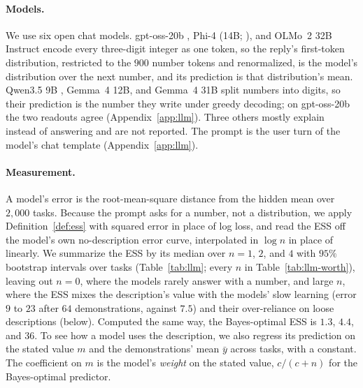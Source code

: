 \documentclass{article}
\begin{document}
\paragraph{Models.} We use six open chat models. gpt-oss-20b \citep{openai2025}, Phi-4 (14B; \citealp{abdin2024}), and OLMo~2 32B Instruct \citep{walsh2025} encode every three-digit integer as one token, so the reply's first-token distribution, restricted to the $900$ number tokens and renormalized, is the model's distribution over the next number, and its prediction is that distribution's mean. Qwen3.5 9B \citep{qwen35}, Gemma~4 12B, and Gemma~4 31B \citep{gemma4} split numbers into digits, so their prediction is the number they write under greedy decoding; on gpt-oss-20b the two readouts agree (Appendix~\ref{app:llm}). Three others mostly explain instead of answering and are not reported. The prompt is the user turn of the model's chat template (Appendix~\ref{app:llm}).


\paragraph{Measurement.} A model's error is the root-mean-square distance from the hidden mean over $2{,}000$ tasks. Because the prompt asks for a number, not a distribution, we apply Definition~\ref{def:ess} with squared error in place of log loss, and read the ESS off the model's own no-description error curve, interpolated in $\log n$ in place of linearly. We summarize the ESS by its median over $n = 1$, $2$, and $4$ with $95\%$ bootstrap intervals over tasks (Table~\ref{tab:llm}; every $n$ in Table~\ref{tab:llm-worth}), leaving out $n = 0$, where the models rarely answer with a number, and large $n$, where the ESS mixes the description's value with the models' slow learning (error $9$ to $23$ after $64$ demonstrations, against $7.5$) and their over-reliance on loose descriptions (below). Computed the same way, the Bayes-optimal ESS is $1.3$, $4.4$, and $36$. To see how a model uses the description, we also regress its prediction on the stated value $m$ and the demonstrations' mean $\bar y$ across tasks, with a constant. The coefficient on $m$ is the model's \emph{weight} on the stated value, $c/(c+n)$ for the Bayes-optimal predictor.
\end{document}
